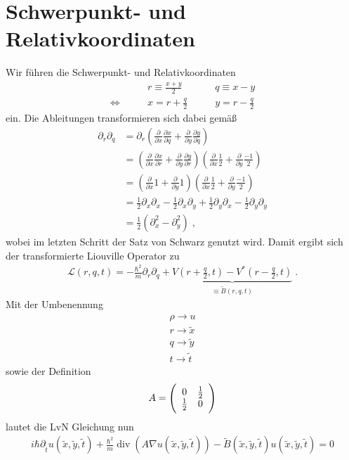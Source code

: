 \section{Schwerpunkt- und Relativkoordinaten}
Wir führen die Schwerpunkt- und Relativkoordinaten
\begin{align}
  &r \equiv \frac{x+y}{2} \qquad &q \equiv x-y \label{eq:gedrehteKoordinaten}\\
  \Leftrightarrow\qquad &x = r+\frac{q}{2} \qquad &y = r-\frac{q}{2}
\end{align}
ein. Die Ableitungen transformieren sich dabei gemäß
\begin{align}
  \partial_r \partial_q  &= \partial_r \left( \frac{\partial}{\partial x} \frac{\partial x}{\partial q} + \frac{\partial}{\partial y} \frac{\partial y}{\partial q}\right) \\
   &= \left( \frac{\partial}{\partial x} \frac{\partial x}{\partial r} + \frac{\partial}{\partial y} \frac{\partial y}{\partial r}\right) \left( \frac{\partial}{\partial x} \frac{1}{2} + \frac{\partial}{\partial y} \frac{-1}{2}\right)\\
    &= \left( \frac{\partial}{\partial x} 1 + \frac{\partial}{\partial y} 1\right) \left( \frac{\partial}{\partial x} \frac{1}{2} + \frac{\partial}{\partial y} \frac{-1}{2}\right)\\
   &= \frac{1}{2}\partial_x \partial_x - \frac{1}{2}\partial_x \partial_y + \frac{1}{2}\partial_y \partial_x - \frac{1}{2}\partial_y \partial_y \\
  &=  \frac{1}{2}(\partial_x^2 - \partial_y^2) \; ,
\end{align}
wobei im letzten Schritt der Satz von Schwarz genutzt wird. Damit ergibt sich der transformierte Liouville Operator zu
\begin{align}
  \mathcal{L}(r,q,t) = -\frac{\hbar^2}{m} \partial_r\partial_q + \underbrace{V\left(r+\frac{q}{2},t\right) - V^*\left(r-\frac{q}{2},t\right)}_{\equiv \tilde{B}(r,q,t)} \; .
\end{align}
Mit der Umbenennung
\begin{align*}
  \rho \longrightarrow u \\
  r \longrightarrow \tilde{x} \\
  q \longrightarrow \tilde{y} \\
  t \longrightarrow \tilde{t}
\end{align*}
sowie der Definition
\begin{align}
  A = \left(\begin{array}{c c} 0 & \frac{1}{2} \\ \frac{1}{2} & 0 \end{array} \right)
\end{align}
lautet die LvN Gleichung nun
\begin{align}
  i\hbar\partial_{\tilde{t}} u(\tilde{x},\tilde{y},\tilde{t})+\frac{\hbar^2}{m}\operatorname{div}(A\nabla u(\tilde{x},\tilde{y},\tilde{t})) -  \tilde{B}(\tilde{x},\tilde{y},\tilde{t}) u(\tilde{x},\tilde{y},\tilde{t}) = 0
\end{align}

